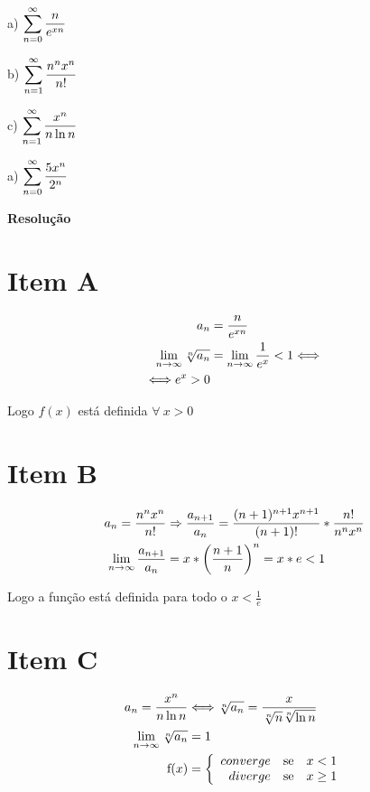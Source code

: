 \documentclass[12pt,openany, letterpaper]{book}
\newcommand{\LI}[1][n]{\lim_{{#1} \rightarrow \infty}}
\newcommand{\soma}[2][n]{\sum_{{#1} = #2}^\infty}
\newcommand{\Resolve}{\begin{center} \textbf{Resolução} \end{center}}
\newcommand{\IT}[1]{Item {#1}}
\begin{document}
{{\begin{multicols}{4}
a) $\displaystyle{\soma{0} {n \over e^{xn}}}$

b) $\displaystyle{\soma{1} {n^n x^n \over n!}}$

c) $\displaystyle{\soma{1} {x^n \over n \ln{n}}}$

a) $\displaystyle{\soma{0} {5x^n \over 2^n}}$
\end{multicols}

\Resolve

\begin{multicols}{2}
\section*{\IT{A}}\begin{align*}
a_n &= {n \over e^{xn}} \\
\LI \sqrt[n]{a_n} &= \LI {1 \over e^x} < 1 \Longleftrightarrow\\
\Longleftrightarrow e^x > 0
\end{align*}

Logo $f(x)$ está definida $\forall \ x > 0$

\section*{\IT{B}}\begin{align*}
a_n = {n^n x^n \over n!} &\Rightarrow {a_{n+1} \over a_n} = {(n+1)^{n+1} x^{n+1} \over (n+1)!}*{n! \over n^n x^n}\\
\LI {a_{n+1} \over a_n} &= x*\left({n+1 \over n}\right)^n = x*e < 1
\end{align*}

Logo a função está definida para todo o $\displaystyle{x < \frac{1}{e}}$

\section*{\IT{C}}\begin{align*}
a_n = {x^n \over n \ln{n}} &\Longleftrightarrow \sqrt[n]{a_n} = { x \over \sqrt[n]{n} \sqrt[n]{\ln{n}}}\\
\LI \sqrt[n]{a_n} &= 1 \\
\hbox{f}(x)
&= \left\{ \begin{array}{rll}
converge & \hbox{se} &  x < 1 \\
diverge & \hbox{se} &  x \geq 1 \\
\end{array}\right.
\end{align*}


\end{multicols}}}
\end{document}
